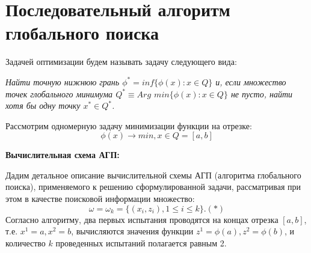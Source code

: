 \documentclass{report}
\begin{document}
\section{Последовательный алгоритм глобального поиска}

Задачей оптимизации будем называть задачу следующего вида:

\textit{Найти точную нижнюю грань $\phi^*= inf \{ \phi(x):x\in Q\}$ и, если множество точек глобального минимума $Q^*\equiv Arg$ $min\{\phi(x): x \in Q\}$ не пусто, найти хотя бы одну точку $x^*\in Q^*$.}

Рассмотрим одномерную задачу минимизации функции на отрезке:
\begin{equation*}
    \phi(x) \rightarrow min, x \in Q = [a,b]
\end{equation*}

\textbf{Вычислительная схема АГП:}

Дадим детальное описание вычислительной схемы АГП (алгоритма глобального поиска), применяемого к решению сформулированной задачи, рассматривая при этом в качестве поисковой информации множество:
\begin{equation*}
    \omega = \omega_k = \{ (x_i, z_i), 1 \leq i \leq k \}.(*)
\end{equation*}
Согласно алгоритму, два первых испытания проводятся на концах отрезка $[a,b]$, т.е. $x^1=a, x^2=b$, вычисляются значения функции $z^1=\phi (a), z^2=\phi (b)$, и количество $k$ проведенных испытаний полагается равным 2.
\end{document}
